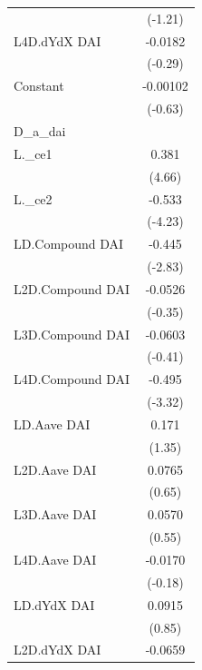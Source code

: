 {\begin{tabular}{l*{1}{c}}
                    &     (-1.21)         \\
\addlinespace
L4D.dYdX DAI        &     -0.0182         \\
                    &     (-0.29)         \\
\addlinespace
Constant            &    -0.00102         \\
                    &     (-0.63)         \\
\midrule
D\_a\_dai             &                     \\
L.\_ce1              &       0.381\sym{***}\\
                    &      (4.66)         \\
\addlinespace
L.\_ce2              &      -0.533\sym{***}\\
                    &     (-4.23)         \\
\addlinespace
LD.Compound DAI     &      -0.445\sym{**} \\
                    &     (-2.83)         \\
\addlinespace
L2D.Compound DAI    &     -0.0526         \\
                    &     (-0.35)         \\
\addlinespace
L3D.Compound DAI    &     -0.0603         \\
                    &     (-0.41)         \\
\addlinespace
L4D.Compound DAI    &      -0.495\sym{***}\\
                    &     (-3.32)         \\
\addlinespace
LD.Aave DAI         &       0.171         \\
                    &      (1.35)         \\
\addlinespace
L2D.Aave DAI        &      0.0765         \\
                    &      (0.65)         \\
\addlinespace
L3D.Aave DAI        &      0.0570         \\
                    &      (0.55)         \\
\addlinespace
L4D.Aave DAI        &     -0.0170         \\
                    &     (-0.18)         \\
\addlinespace
LD.dYdX DAI         &      0.0915         \\
                    &      (0.85)         \\
\addlinespace
L2D.dYdX DAI        &     -0.0659         \\

\end{tabular}}
